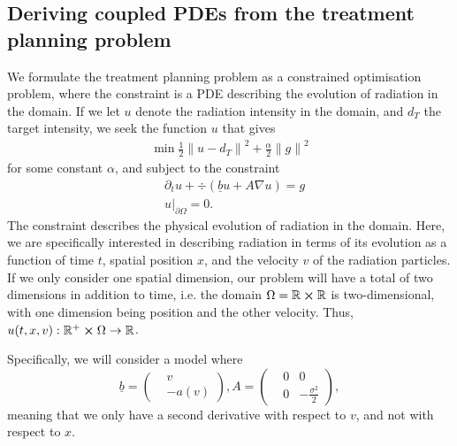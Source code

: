 \documentclass{article}  %
\begin{document}
\subsection{Deriving coupled PDEs from the treatment planning problem}







We formulate the treatment planning problem as a constrained optimisation problem, where the constraint is a PDE describing the evolution of radiation in the domain. If we let $u$ denote the radiation intensity in the domain, and $d_T$ the target intensity, we seek the function $u$ that gives
%
\begin{align} 
    \label{eq:to-minimise}
    \min \frac{1}{2} {\lVert u - d_T \rVert}^2 + \frac{\alpha}{2} {\lVert g \rVert}^2
\end{align}
%
for some constant $\alpha$, and subject to the constraint
%
\begin{align}
    \label{eq:pde-constraint}
    &\partial_t u + \div{(\underline{b} u + A \nabla u)} = g\\
    &{u \rvert}_{\partial \Omega} = 0.
\end{align}
%
The constraint describes the physical evolution of radiation in the domain. Here, we are specifically interested in describing radiation in terms of its evolution as a function of time $t$, spatial position $x$, and the velocity $v$ of the radiation particles. If we only consider one spatial dimension, our problem will have a total of two dimensions in addition to time, i.e. the domain $\Omega=\mathbb{R}\cross\mathbb{R}$ is two-dimensional, with one dimension being position and the other velocity. Thus, $u(t,x,v): \mathbb{R}^{+} \cross \Omega \rightarrow \mathbb{R}$.

Specifically, we will consider a model where
%
\begin{equation}
\underline{b} = 
\begin{pmatrix}
    &v\\
    &-a(v)
\end{pmatrix},
A = 
\begin{pmatrix}
    &0 &0\\
    &0 &-\frac{\sigma^2}{2}
\end{pmatrix},
\end{equation}
%
meaning that we only have a second derivative with respect to $v$, and not with respect to $x$.
\end{document}
